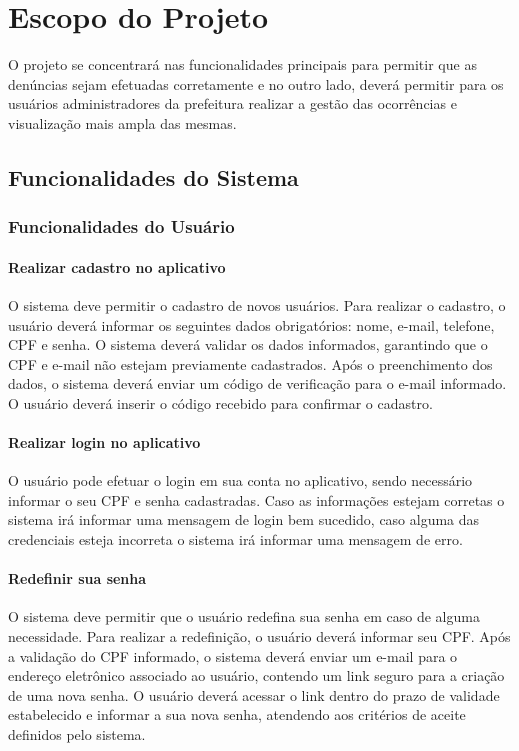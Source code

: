 
\chapter{Escopo do Projeto}


O projeto se concentrará nas funcionalidades principais para permitir que as denúncias sejam efetuadas corretamente e no outro lado, deverá permitir para os usuários administradores da prefeitura realizar a gestão das ocorrências e visualização mais ampla das mesmas.


\section{Funcionalidades do Sistema}

\subsection{Funcionalidades do Usuário}
\subsubsection{Realizar cadastro no aplicativo}
O sistema deve permitir o cadastro de novos usuários. Para realizar o cadastro, o usuário deverá informar os seguintes dados obrigatórios: nome, e-mail, telefone, CPF e senha. O sistema deverá validar os dados informados, garantindo que o CPF e e-mail não estejam previamente cadastrados. Após o preenchimento dos dados, o sistema deverá enviar um código de verificação para o e-mail informado. O usuário deverá inserir o código recebido para confirmar o cadastro.



\subsubsection{Realizar login no aplicativo}

O usuário pode efetuar o login em sua conta no aplicativo, sendo necessário informar o seu CPF e senha cadastradas. Caso as informações estejam corretas o sistema irá informar uma mensagem de login bem sucedido, caso alguma das credenciais esteja incorreta o sistema irá informar uma mensagem de erro.

\subsubsection{Redefinir sua senha}

O sistema deve permitir que o usuário redefina sua senha em caso de alguma necessidade. Para realizar a redefinição, o usuário deverá informar seu CPF. Após a validação do CPF informado, o sistema deverá enviar um e-mail para o endereço eletrônico associado ao usuário, contendo um link seguro para a criação de uma nova senha. O usuário deverá acessar o link dentro do prazo de validade estabelecido e informar a sua nova senha, atendendo aos critérios de aceite definidos pelo sistema.

